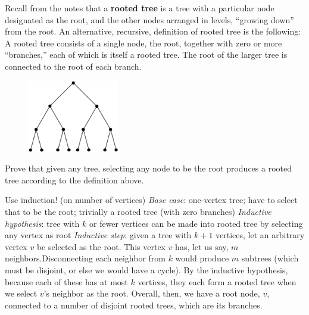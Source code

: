 \question Recall from the notes that a \textbf{rooted tree} is a tree 
with a particular node designated as the root, and the other nodes 
arranged in levels, “growing down” from the root. An alternative, 
recursive, definition of rooted tree is the following:  A rooted tree 
consists of a single node, the root, together with zero or more 
“branches,” each of which is itself a rooted tree. The root of the 
larger tree is connected to the root of each branch. \newline
\begin{figure}[h]
\includegraphics{rooted_tree}
\centering
\end{figure}\newline
Prove that given any tree, selecting any node to be the root produces 
a rooted tree according to the definition above.

\begin{solution}[1.5in]
Use induction! (on number of vertices)\newline
\textit{Base case}: one-vertex tree; have to select that to be the 
root; trivially a rooted tree (with zero branches)\newline
\textit{Inductive hypothesis}: tree with $k$ or fewer vertices can 
be made into rooted tree by selecting any vertex as root\newline
\textit{Inductive step}: given a tree with $k + 1$ vertices, let an 
arbitrary vertex $v$ be selected as the root. This vertex $v$ has, 
let us say, $m$ neighbors.\newline Disconnecting each neighbor from 
$k$ would produce $m$ subtrees (which must be disjoint, or else we 
would have a cycle). By the inductive hypothesis, because each of 
these has at most $k$ vertices, they each form a rooted tree when we 
select $v$’s neighbor as the root. Overall, then, we have a root node, 
$v$, connected to a number of disjoint rooted trees, which are its 
branches.
\end{solution}